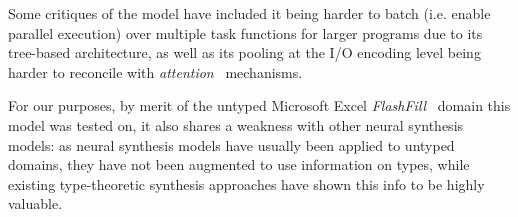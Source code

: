 \documentclass{article} %
\begin{document}

Some critiques of the model have included it being harder to batch (i.e. enable parallel execution) over multiple task functions for larger programs due to its tree-based architecture,
as well as its pooling at the I/O encoding level being harder to reconcile with
\emph{attention}~\citep{bahdanau2014neural} mechanisms.~\citep{devlin2017robustfill}

For our purposes, by merit of the untyped Microsoft Excel \emph{FlashFill}~\citep{prose} domain this model was tested on,
it also shares a weakness with other neural synthesis models:
as neural synthesis models have usually been applied to untyped domains,
they have not been augmented to use information on types,
while existing type-theoretic synthesis approaches have shown this info to be highly valuable.



\end{document}
